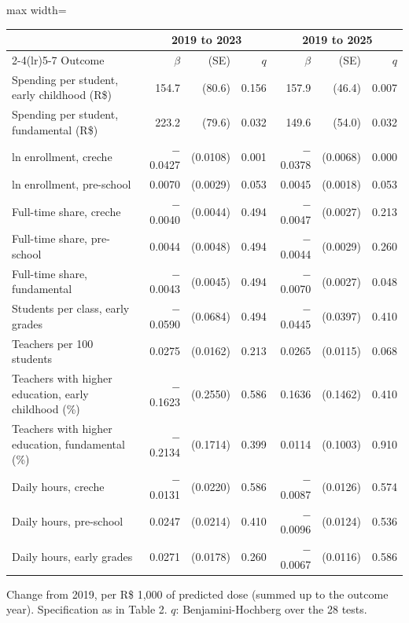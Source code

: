 \begin{adjustbox}{max width=\linewidth}
\begin{tabular}{lrrrrrr}
\toprule
 & \multicolumn{3}{c}{2019 to 2023} & \multicolumn{3}{c}{2019 to 2025} \\
\cmidrule(lr){2-4}\cmidrule(lr){5-7}
Outcome & $\beta$ & (SE) & $q$ & $\beta$ & (SE) & $q$ \\
\midrule
Spending per student, early childhood (R\$) & 154.7 & (80.6) & 0.156 & 157.9 & (46.4) & 0.007 \\
Spending per student, fundamental (R\$) & 223.2 & (79.6) & 0.032 & 149.6 & (54.0) & 0.032 \\
ln enrollment, creche & $-$0.0427 & (0.0108) & 0.001 & $-$0.0378 & (0.0068) & 0.000 \\
ln enrollment, pre-school & 0.0070 & (0.0029) & 0.053 & 0.0045 & (0.0018) & 0.053 \\
Full-time share, creche & $-$0.0040 & (0.0044) & 0.494 & $-$0.0047 & (0.0027) & 0.213 \\
Full-time share, pre-school & 0.0044 & (0.0048) & 0.494 & $-$0.0044 & (0.0029) & 0.260 \\
Full-time share, fundamental & $-$0.0043 & (0.0045) & 0.494 & $-$0.0070 & (0.0027) & 0.048 \\
Students per class, early grades & $-$0.0590 & (0.0684) & 0.494 & $-$0.0445 & (0.0397) & 0.410 \\
Teachers per 100 students & 0.0275 & (0.0162) & 0.213 & 0.0265 & (0.0115) & 0.068 \\
Teachers with higher education, early childhood (\%) & $-$0.1623 & (0.2550) & 0.586 & 0.1636 & (0.1462) & 0.410 \\
Teachers with higher education, fundamental (\%) & $-$0.2134 & (0.1714) & 0.399 & 0.0114 & (0.1003) & 0.910 \\
Daily hours, creche & $-$0.0131 & (0.0220) & 0.586 & $-$0.0087 & (0.0126) & 0.574 \\
Daily hours, pre-school & 0.0247 & (0.0214) & 0.410 & $-$0.0096 & (0.0124) & 0.536 \\
Daily hours, early grades & 0.0271 & (0.0178) & 0.260 & $-$0.0067 & (0.0116) & 0.586 \\
\bottomrule
\end{tabular}
\end{adjustbox}
\par\smallskip\begin{minipage}{0.95\linewidth}\footnotesize Change from 2019, per R\$ 1,000 of predicted dose (summed up to the outcome year). Specification as in Table 2. $q$: Benjamini-Hochberg over the 28 tests.\end{minipage}
